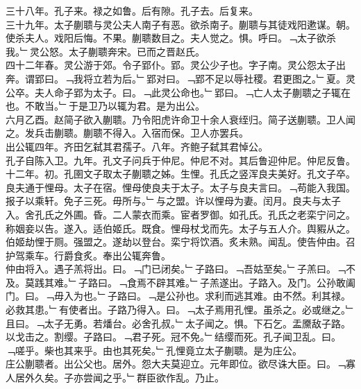 \documentclass{zhvt-classic}
\begin{document}
\hspace*{2em}三十八年。孔子来。禄之如鲁。后有隙。孔子去。后复来。\\
\hspace*{2em}三十九年。太子蒯聩与灵公夫人南子有恶。欲杀南子。蒯聩与其徒戏阳遬谋。朝。使杀夫人。戏阳后悔。不果。蒯聩数目之。夫人觉之。惧。呼曰。﹁太子欲杀我。﹂灵公怒。太子蒯聩奔宋。已而之晋赵氏。\\
\hspace*{2em}四十二年春。灵公游于郊。令子郢仆。郢。灵公少子也。字子南。灵公怨太子出奔。谓郢曰。﹁我将立若为后。﹂郢对曰。﹁郢不足以辱社稷。君更图之。﹂夏。灵公卒。夫人命子郢为太子。曰。﹁此灵公命也。﹂郢曰。﹁亡人太子蒯聩之子辄在也。不敢当。﹂于是卫乃以辄为君。是为出公。\\
\hspace*{2em}六月乙酉。赵简子欲入蒯聩。乃令阳虎许命卫十余人衰绖归。简子送蒯聩。卫人闻之。发兵击蒯聩。蒯聩不得入。入宿而保。卫人亦罢兵。\\
\hspace*{2em}出公辄四年。齐田乞弑其君孺子。八年。齐鲍子弑其君悼公。\\
\hspace*{2em}孔子自陈入卫。九年。孔文子问兵于仲尼。仲尼不对。其后鲁迎仲尼。仲尼反鲁。\\
\hspace*{2em}十二年。初。孔圉文子取太子蒯聩之姊。生悝。孔氏之竖浑良夫美好。孔文子卒。良夫通于悝母。太子在宿。悝母使良夫于太子。太子与良夫言曰。﹁苟能入我国。报子以乘轩。免子三死。毋所与。﹂与之盟。许以悝母为妻。闰月。良夫与太子入。舍孔氏之外圃。昏。二人蒙衣而乘。宦者罗御。如孔氏。孔氏之老栾宁问之。称姻妾以告。遂入。适伯姬氏。既食。悝母杖戈而先。太子与五人介。舆豭从之。伯姬劫悝于厕。强盟之。遂劫以登台。栾宁将饮酒。炙未熟。闻乱。使告仲由。召护驾乘车。行爵食炙。奉出公辄奔鲁。\\
\hspace*{2em}仲由将入。遇子羔将出。曰。﹁门已闭矣。﹂子路曰。﹁吾姑至矣。﹂子羔曰。﹁不及。莫践其难。﹂子路曰。﹁食焉不辟其难。﹂子羔遂出。子路入。及门。公孙敢阖门。曰。﹁毋入为也。﹂子路曰。﹁是公孙也。求利而逃其难。由不然。利其禄。必救其患。﹂有使者出。子路乃得入。曰。﹁太子焉用孔悝。虽杀之。必或继之。﹂且曰。﹁太子无勇。若燔台。必舍孔叔。﹂太子闻之。惧。下石乞。盂黡敌子路。以戈击之。割缨。子路曰。﹁君子死。冠不免。﹂结缨而死。孔子闻卫乱。曰。﹁嗟乎。柴也其来乎。由也其死矣。﹂孔悝竟立太子蒯聩。是为庄公。\\
\hspace*{2em}庄公蒯聩者。出公父也。居外。怨大夫莫迎立。元年即位。欲尽诛大臣。曰。﹁寡人居外久矣。子亦尝闻之乎。﹂群臣欲作乱。乃止。\\
\end{document}

